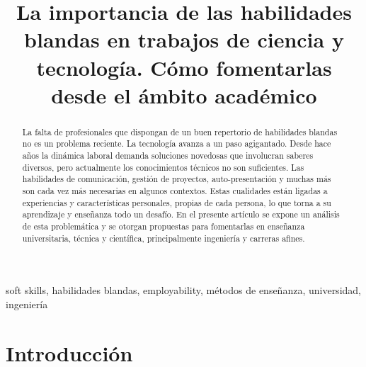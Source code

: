 \documentclass[conference]{IEEEtran}
\begin{document}
\title{La importancia de las habilidades blandas en trabajos de ciencia y tecnología. Cómo fomentarlas desde el ámbito académico
}

\author{
}

\maketitle


\begin{abstract}
La falta de profesionales que dispongan de un buen repertorio de habilidades blandas no es un problema reciente. La tecnología avanza a un paso agigantado. Desde hace años la dinámica laboral demanda soluciones novedosas que involucran saberes diversos, pero actualmente los conocimientos técnicos no son suficientes. Las habilidades de comunicación, gestión de proyectos, auto-presentación y muchas más son cada vez más necesarias en algunos contextos. Estas cualidades están ligadas a experiencias y características personales, propias de cada persona, lo que torna a su aprendizaje y enseñanza todo un desafío. En el presente artículo se expone un análisis de esta problemática y se otorgan propuestas para fomentarlas en enseñanza universitaria, técnica y científica, principalmente ingeniería y carreras afines.
\end{abstract}

\begin{IEEEkeywords}
	soft skills, habilidades blandas, employability, métodos de enseñanza, universidad, ingeniería
\end{IEEEkeywords}

\section{Introducción}
\label{scrivauto:1}
\end{document}
